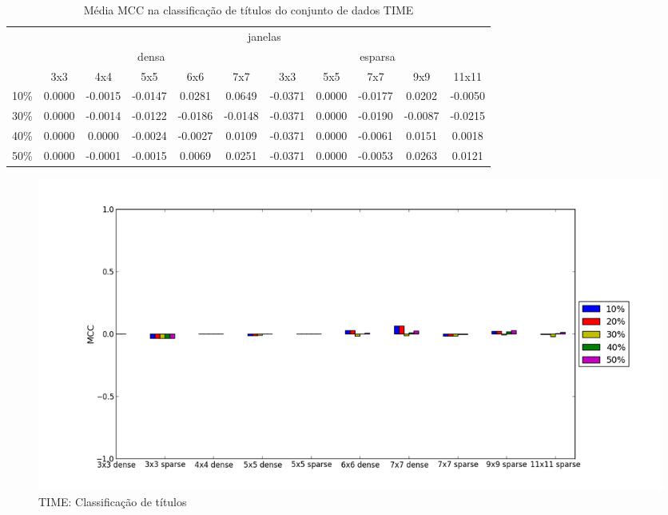 \documentclass[a4paper,11pt]{article}
\begin{document}
  \begin{center}
    \begin{table}[p]
      \caption{Média MCC na classificação de títulos do conjunto de dados TIME}
      \begin{tabular}{ l | c c c c c || c c c c c | }
        \cline{2-11}
        & \multicolumn{10}{|c|}{janelas} \\
        \cline{2-11}
        & \multicolumn{5}{c||}{densa} & \multicolumn{5}{c|}{esparsa} \\
        \cline{2-11}
        & 3x3 & 4x4 & 5x5 & 6x6 & 7x7 & 3x3 & 5x5 & 7x7 & 9x9 & 11x11 \\
        \hline
        \multicolumn{1}{|l|}{10\%}& 0.0000& -0.0015& -0.0147& 0.0281& 0.0649& -0.0371& 0.0000& -0.0177& 0.0202& -0.0050\\
        \multicolumn{1}{|l|}{30\%}& 0.0000& -0.0014& -0.0122& -0.0186& -0.0148& -0.0371& 0.0000& -0.0190& -0.0087& -0.0215\\
        \multicolumn{1}{|l|}{40\%}& 0.0000& 0.0000& -0.0024& -0.0027& 0.0109& -0.0371& 0.0000& -0.0061& 0.0151& 0.0018\\
        \multicolumn{1}{|l|}{50\%}& 0.0000& -0.0001& -0.0015& 0.0069& 0.0251& -0.0371& 0.0000& -0.0053& 0.0263& 0.0121\\
        \hline  
      \end{tabular}
    \end{table}
  \end{center}

  \begin{figure}[p]
    \centerline{\includegraphics[width=1.2\textwidth]{assets/experiment_charts/time_TextRegion_heading_mcc.png}}
    \caption{TIME: Classificação de títulos}
    \label{fig:time_TextRegion_heading_mcc}
  \end{figure}

  
\end{document}
